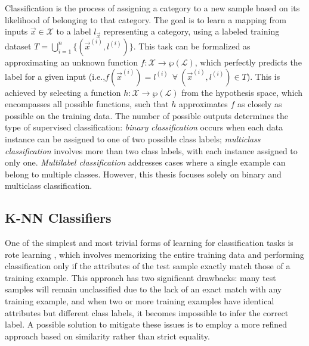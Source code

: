Classification is the process of assigning a category to a new sample based on its likelihood of belonging to that category. The goal is to learn a mapping from inputs $\vec{x} \in \mathcal{X}$ to a label $l_{\vec{x}}$ representing a category, using a labeled training dataset $T=\bigcup_{i=1}^n\{(\vec{x}^{(i)}, l^{(i)})\}$. This task can be formalized as approximating an unknown function $f\colon \mathcal{X} \rightarrow \wp(\mathcal{L})$, which perfectly predicts the label for a given input (i.e.,$f(\vec{x}^{(i)}) = l^{(i)}\ \ \forall\ (\vec{x}^{(i)}, l^{(i)}) \in T$). This is achieved by selecting a function $h \colon \mathcal{X} \rightarrow \wp(\mathcal{L})$ from the hypothesis space, which encompasses all possible functions, such that $h$ approximates $f$ as closely as possible on the training data. The number of possible outputs determines the type of supervised classification: \emph{binary classification} occurs when each data instance can be assigned to one of two possible class labels; \emph{multiclass classification} involves more than two class labels, with each instance assigned to only one. \emph{Multilabel classification} addresses cases where a single example can belong to multiple classes. However, this thesis focuses solely on binary and multiclass classification.


\subsection{K-NN Classifiers}
\label{subsec:knn-classifiers}

One of the simplest and most trivial forms of learning for classification tasks is rote learning \cite{daniels2015rote}, which involves memorizing the entire training data and performing classification only if the attributes of the test sample exactly match those of a training example. This approach has two significant drawbacks: many test samples will remain unclassified due to the lack of an exact match with any training example, and when two or more training examples have identical attributes but different class labels, it becomes impossible to infer the correct label. A possible solution to mitigate these issues is to employ a more refined approach based on similarity rather than strict equality.

